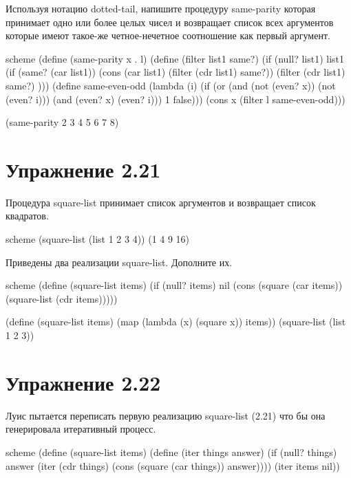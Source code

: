 Используя нотацию dotted-tail, напишите процедуру same-parity которая принимает одно или более целых чисел и возвращает список всех аргументов которые имеют такое-же четное-нечетное соотношение как первый аргумент.

\begin{codelisting}{scheme}
(define (same-parity x . l)
  (define (filter list1 same?)
    (if (null? list1)
        list1
        (if (same? (car list1))
            (cons (car list1) (filter (cdr list1) same?))
            (filter (cdr list1) same?)
            )))
  (define same-even-odd (lambda (i) (if (or (and (not (even? x)) (not (even? i))) (and (even? x) (even? i))) 1 false)))
  (cons x (filter l same-even-odd)))

(same-parity 2 3 4 5 6 7 8)
\end{codelisting}

\chapter{Упражнение 2.21}

Процедура square-list принимает список аргументов и возвращает список квадратов.

\begin{codelisting}{scheme}
(square-list (list 1 2 3 4))
(1 4 9 16)
\end{codelisting}

Приведены два реализации square-list. Дополните их.

\begin{codelisting}{scheme}
(define (square-list items)
  (if (null? items)
      nil
      (cons (square (car items)) (square-list (cdr items)))))


(define (square-list items)
  (map (lambda (x) (square x)) items))
(square-list (list 1 2 3))
\end{codelisting}


\chapter{Упражнение 2.22}

Луис пытается переписать первую реализацию square-list (2.21) что бы она генерировала итеративный процесс.

\begin{codelisting}{scheme}
(define (square-list items)
  (define (iter things answer)
    (if (null? things)
        answer
        (iter (cdr things) 
              (cons (square (car things))
                    answer))))
  (iter items nil))
\end{codelisting}

